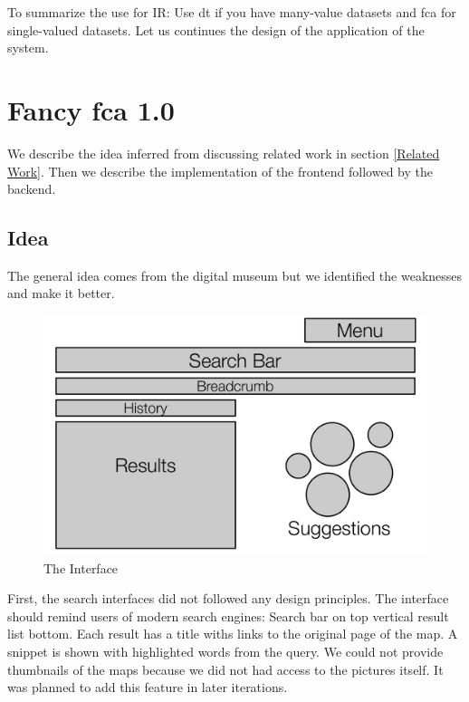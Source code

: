 \documentclass[11pt]{report}
\begin{document}
{{To summarize the use for IR: Use \acrshort{dt} if you have many-value datasets and \acrshort{fca} for single-valued datasets. Let us continues the design of the application of the system.

\chapter{Fancy \acrshort{fca} 1.0}
\label{Fancy 1.0}

We describe the idea inferred from discussing related work in section \ref{Related Work}. Then we describe the implementation of the frontend followed by the backend.

\section{Idea}

The general idea comes from the digital museum but we identified the weaknesses and make it better. \\

\begin{figure}[!ht]
	\centering
	\includegraphics[width=\linewidth]{images/schema}
\caption{The Interface}
\label{figure:schema}
\end{figure}

First, the search interfaces did not followed any design principles. The interface should remind users of modern search engines: Search bar on top vertical result list bottom. Each result has a title withs links to the original page of the map. A snippet is shown with highlighted words from the query. We could not provide thumbnails of the maps because we did not had access to the pictures itself. It was planned to add this feature in later iterations. \\

}}
\end{document}
